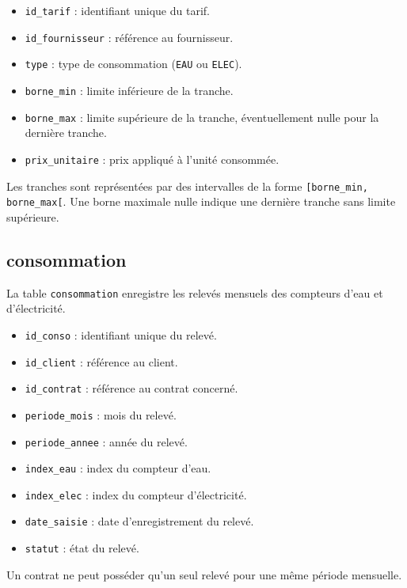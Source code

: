 \begin{itemize}[leftmargin=*]
    \item \texttt{id\_tarif} : identifiant unique du tarif.
    \item \texttt{id\_fournisseur} : référence au fournisseur.
    \item \texttt{type} : type de consommation (\texttt{EAU} ou \texttt{ELEC}).
    \item \texttt{borne\_min} : limite inférieure de la tranche.
    \item \texttt{borne\_max} : limite supérieure de la tranche, éventuellement nulle pour la dernière tranche.
    \item \texttt{prix\_unitaire} : prix appliqué à l'unité consommée.
\end{itemize}

Les tranches sont représentées par des intervalles de la forme
\texttt{[borne\_min, borne\_max[}. Une borne maximale nulle indique une dernière tranche sans limite supérieure.

\subsection{consommation}

La table \texttt{consommation} enregistre les relevés mensuels des compteurs d'eau et d'électricité.

\begin{itemize}[leftmargin=*]
    \item \texttt{id\_conso} : identifiant unique du relevé.
    \item \texttt{id\_client} : référence au client.
    \item \texttt{id\_contrat} : référence au contrat concerné.
    \item \texttt{periode\_mois} : mois du relevé.
    \item \texttt{periode\_annee} : année du relevé.
    \item \texttt{index\_eau} : index du compteur d'eau.
    \item \texttt{index\_elec} : index du compteur d'électricité.
    \item \texttt{date\_saisie} : date d'enregistrement du relevé.
    \item \texttt{statut} : état du relevé.
\end{itemize}

Un contrat ne peut posséder qu'un seul relevé pour une même période mensuelle.

